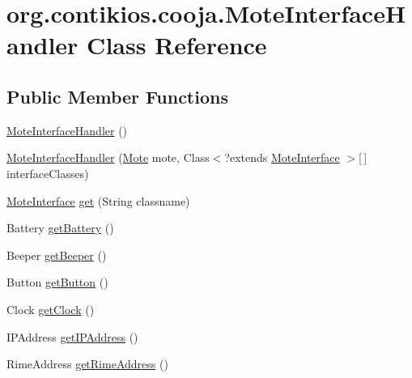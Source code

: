 \hypertarget{classorg_1_1contikios_1_1cooja_1_1MoteInterfaceHandler}{\section{org.\-contikios.\-cooja.\-Mote\-Interface\-Handler Class Reference}
\label{classorg_1_1contikios_1_1cooja_1_1MoteInterfaceHandler}
}
\subsection*{Public Member Functions}
\begin{DoxyCompactItemize}
\item 
\hyperlink{classorg_1_1contikios_1_1cooja_1_1MoteInterfaceHandler_a72f60f99130084750b9c51e4b09a3083}{Mote\-Interface\-Handler} ()
\item 
\hyperlink{classorg_1_1contikios_1_1cooja_1_1MoteInterfaceHandler_a2b5420f067a850e988da6d53d253b5e5}{Mote\-Interface\-Handler} (\hyperlink{interfaceorg_1_1contikios_1_1cooja_1_1Mote}{Mote} mote, Class$<$?extends \hyperlink{classorg_1_1contikios_1_1cooja_1_1MoteInterface}{Mote\-Interface} $>$\mbox{[}$\,$\mbox{]} interface\-Classes)
\item 
\hyperlink{classorg_1_1contikios_1_1cooja_1_1MoteInterface}{Mote\-Interface} \hyperlink{classorg_1_1contikios_1_1cooja_1_1MoteInterfaceHandler_a1bbbab6a19d416c59087bb78951628b3}{get} (String classname)
\item 
Battery \hyperlink{classorg_1_1contikios_1_1cooja_1_1MoteInterfaceHandler_ad1b97d695565157c9f9145bd585ab0f2}{get\-Battery} ()
\item 
Beeper \hyperlink{classorg_1_1contikios_1_1cooja_1_1MoteInterfaceHandler_a4331cc7577b2e09fd87e00ca6a1fc844}{get\-Beeper} ()
\item 
Button \hyperlink{classorg_1_1contikios_1_1cooja_1_1MoteInterfaceHandler_aa686e64d9f84f1b4906eea500c6798f4}{get\-Button} ()
\item 
Clock \hyperlink{classorg_1_1contikios_1_1cooja_1_1MoteInterfaceHandler_a668496b5a39f228fb2a17329677b2b13}{get\-Clock} ()
\item 
I\-P\-Address \hyperlink{classorg_1_1contikios_1_1cooja_1_1MoteInterfaceHandler_a9cfdbcabb9bd1b483c0c6b7ee39a64eb}{get\-I\-P\-Address} ()
\item 
Rime\-Address \hyperlink{classorg_1_1contikios_1_1cooja_1_1MoteInterfaceHandler_a8166f98272f183e940467c36de5b6a74}{get\-Rime\-Address} ()

\end{DoxyCompactItemize}
